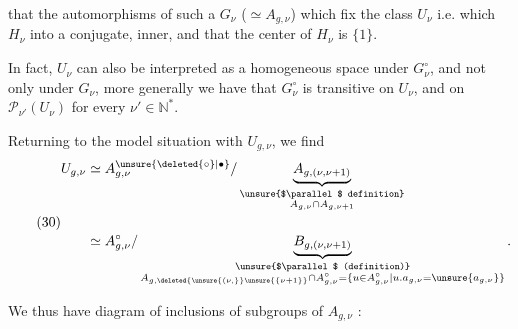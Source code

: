 that the automorphisms of such a $G_\nu$ ($\simeq A_{g,\nu}$) which fix the class $U_\nu$ i.e. which  $H_\nu$ into a conjugate,  inner, and that the center of $H_\nu$ is $\{1\}$.

In fact, $U_\nu$ can also be interpreted as a homogeneous space under $G_\nu^\circ$, and not only under $G_\nu$, more generally we have that $G_\nu^\circ$ is transitive on $U_\nu$, and  on $\mathcal P_{\nu'}(U_\nu)$ for every $\nu'\in\mathbb N^*$.

Returning to the model situation with $U_{g,\nu}$, we find
\[
\tag{30}
\begin{aligned}
U_{g,\nu}
&\simeq A_{g,\nu}^{\unsure{\deleted{\circ}|\bullet}}/
\underbrace{A_{g,(\nu,\nu+1)}}_{\substack{\text{\unsure{$\parallel$ definition}}\\ A_{g,\nu}\cap A_{g,\nu+1}}}\\[1.2em]
&\simeq A_{g,\nu}^{\circ}/
\underbrace{B_{g,(\nu,\nu+1)}}_{\substack{\text{\unsure{$\parallel$ (definition)}}\\
 A_{g,\deleted{\unsure{(\nu,}}\unsure{\{\nu+1\}}}\cap A_{g,\nu}^{\circ}
 =\{u\in A_{g,\nu}^{\circ}\mid u.a_{g,\nu}=\unsure{a_{g,\nu}}\}}}.
\end{aligned}
\]

We thus have    diagram of inclusions of subgroups of $A_{g,\nu}$ :

